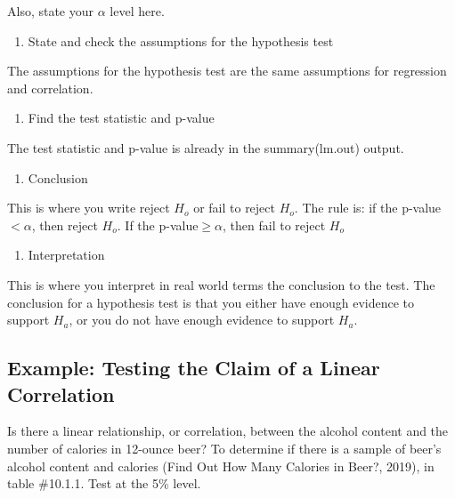 \documentclass[
]{book}
\providecommand{\tightlist}{%
  \setlength{\itemsep}{0pt}\setlength{\parskip}{0pt}}
\begin{document}
Also, state your \(\alpha\) level here.

\begin{enumerate}
\def\labelenumi{\arabic{enumi}.}
\setcounter{enumi}{2}
\tightlist
\item
  State and check the assumptions for the hypothesis test
\end{enumerate}

The assumptions for the hypothesis test are the same assumptions for regression and correlation.

\begin{enumerate}
\def\labelenumi{\arabic{enumi}.}
\setcounter{enumi}{3}
\tightlist
\item
  Find the test statistic and p-value
\end{enumerate}

The test statistic and p-value is already in the summary(lm.out) output.

\begin{enumerate}
\def\labelenumi{\arabic{enumi}.}
\setcounter{enumi}{4}
\tightlist
\item
  Conclusion
\end{enumerate}

This is where you write reject \(H_o\) or fail to reject \(H_o\). The rule is: if the p-value \(<\alpha\), then reject \(H_o\). If the p-value\(\ge \alpha\), then fail to reject \(H_o\)

\begin{enumerate}
\def\labelenumi{\arabic{enumi}.}
\setcounter{enumi}{5}
\tightlist
\item
  Interpretation
\end{enumerate}

This is where you interpret in real world terms the conclusion to the test. The conclusion for a hypothesis test is that you either have enough evidence to support \(H_a\), or you do not have enough evidence to support \(H_a\).

\hypertarget{example-testing-the-claim-of-a-linear-correlation}{%
\subsection{Example: Testing the Claim of a Linear Correlation}\label{example-testing-the-claim-of-a-linear-correlation}}

Is there a linear relationship, or correlation, between the alcohol content and the number of calories in 12-ounce beer? To determine if there is a sample of beer's alcohol content and calories (Find Out How Many Calories in Beer?, 2019), in table \#10.1.1. Test at the 5\% level.
\end{document}
